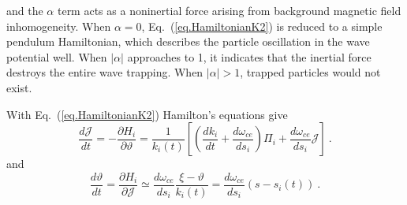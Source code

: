 and 
the $\alpha$ term acts as a noninertial force arising from background magnetic field inhomogeneity.
When $\alpha = 0$, Eq.~(\ref{eq.HamiltonianK2}) is reduced to a simple pendulum Hamiltonian, which describes the particle oscillation in the wave potential well.
When $|\alpha|$ approaches to 1, it indicates that the inertial force destroys the entire wave trapping. 
When $|\alpha|>1$, trapped particles would not exist.

With Eq.~(\ref{eq.HamiltonianK2}) Hamilton's equations  give 
\begin{equation}\label{eq.m3}
        \frac{d \mathcal{J}}{d t} =-\frac{\partial H_{i}}{\partial \vartheta}=\frac{1}{k_{i}(t)}\left[\left(\frac{d k_{i}}{d t}+\frac{d \omega_{c e}}{d s_{i}}\right) \Pi_{i}+\frac{d \omega_{c e}}{d s_{i}} \mathcal{J}\right]~.
\end{equation}
and
\begin{equation}\label{eq.m4}
    \frac{d \vartheta}{d t} =\frac{\partial H_{i}}{\partial \mathcal{J}} \simeq \frac{d \omega_{c e}}{d s_{i}} \frac{\xi-\vartheta}{k_{i}(t)}=\frac{d \omega_{c e}}{d s_{i}}\left(s-s_{i}(t)\right)~.
\end{equation}
